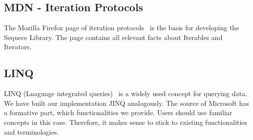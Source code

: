 \subsection{MDN - Iteration Protocols}
\label{sub:MDN - Iteration Protocols}
The Mozilla Firefox page of iteration protocols~\cite{mdn_protocols} is the basis for developing the
Sequece Library. The page contains all relevant facts about Iterables and
Iterators.

\subsection{LINQ}
\label{sub:LINQ}
LINQ (Lnaguage integrated queries)~\cite{LINQ} is a widely used concept for querying data.
We have built our implementation JINQ analogously. The source of Microsoft has
a formative part, which functionalities we provide. Users should use familiar
concepts in this case. Therefore, it makes sense to stick to existing
functionalities and terminologies.
